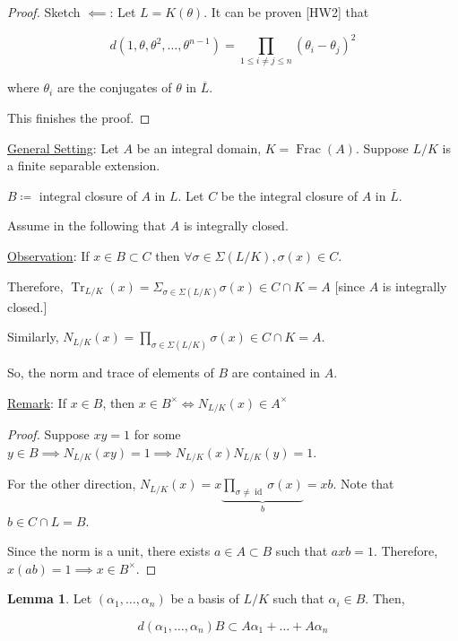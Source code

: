\documentclass[openany]{amsbook}
\numberwithin{section}{chapter}
\theoremstyle{definition}
\newtheorem{lemma}[theorem]{Lemma}
\newcommand{\Frac}{\operatorname{Frac}}
\newcommand{\Tr}{\operatorname{Tr}}
\newcommand{\id}{\operatorname{id}}
\begin{document}
\begin{proof}
    Sketch \(\impliedby\): Let \(L = K(\theta)\). It can be proven [HW2] that
    
    \[
        d(1, \theta , \theta ^2, \dots , \theta^{n-1}) = \prod_{1 \leq i \neq j \leq n}^{} (\theta_i - \theta_j)^2
    \]
    
    where \(\theta_i\) are the conjugates of \(\theta\) in \(\overline{L}\).

    This finishes the proof.
\end{proof}

\underline{General Setting}: Let \(A\) be an integral domain, \(K = \Frac(A)\). Suppose \(L / K\) is a finite separable extension.

\(B \coloneqq \) integral closure of \(A\) in \(L\). Let \(C\) be the integral closure of \(A\) in \(\overline{L}\).

Assume in the following that \(A\) is integrally closed.

\underline{Observation}: If \(x\in B \subset C\) then \(\forall \sigma \in \Sigma (L / K), \sigma(x)\in C\).

Therefore, \(\Tr_{L / K}(x) = \Sigma_{\sigma \in \Sigma (L / K)} \sigma(x) \in C \cap K = A\) [since \(A\) is integrally closed.]

Similarly, \(N_{L / K}(x) = \prod_{\sigma \in \Sigma (L / K)}^{} \sigma (x) \in C\cap K = A\).

So, the norm and trace of elements of \(B\) are contained in \(A\). 

\underline{Remark}: If \(x\in B\), then \(x\in B^{\times} \iff N_{L / K} (x)\in A^\times\) 

\begin{proof}
    Suppose \(xy = 1\) for some \(y\in B \implies N_{L / K}(xy) = 1 \implies N_{L / K}(x) N_{L / K}(y) = 1\).

    For the other direction, \(N_{L / K}(x) = x \underbrace{\prod_{\sigma \neq \id}^{} \sigma(x)}_{b} = xb\). Note that \(b \in C \cap L = B\). 

    Since the norm is a unit, there exists \(a\in A \subset B\) such that \(axb = 1\). Therefore, \(x(ab) = 1 \implies x\in B^\times\).

\end{proof}

\begin{lemma}
    Let \((\alpha_1, \dots , \alpha_n)\) be a basis of \(L / K\) such that \(\alpha_i \in B\). Then,

    \[
        d(\alpha_1, \dots , \alpha_n) B \subset A \alpha_1 + \dots + A \alpha_n
    \]
\end{lemma}
\end{document}

